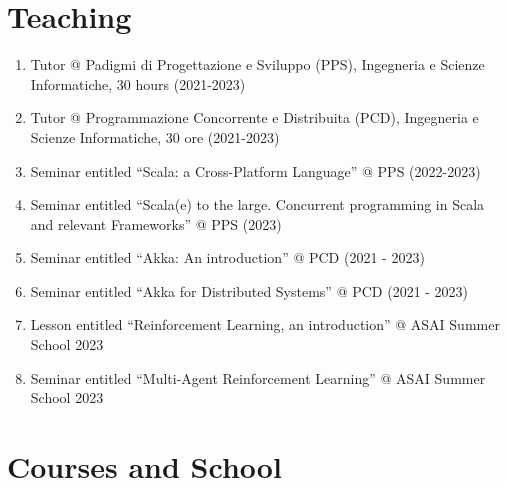\documentclass[11pt]{article}
\begin{document}
\section{Teaching}
\begin{enumerate}
	\item Tutor @ Padigmi di Progettazione e Sviluppo (PPS), Ingegneria e Scienze Informatiche, 30 hours (2021-2023)
	\item Tutor @ Programmazione Concorrente e Distribuita (PCD), Ingegneria e Scienze Informatiche, 30 ore (2021-2023)
	\item Seminar entitled ``Scala: a Cross-Platform Language'' @ PPS (2022-2023)
	\item Seminar entitled ``Scala(e) to the large. Concurrent programming in Scala and relevant Frameworks'' @ PPS (2023)
	\item Seminar entitled ``Akka: An introduction'' @ PCD (2021 - 2023)
	\item Seminar entitled ``Akka for Distributed Systems'' @ PCD (2021 - 2023)
	\item Lesson entitled ``Reinforcement Learning, an introduction'' @ ASAI Summer School 2023
	\item Seminar entitled ``Multi-Agent Reinforcement Learning'' @ ASAI Summer School 2023
\end{enumerate}
\section{Courses and School}
\end{document}
